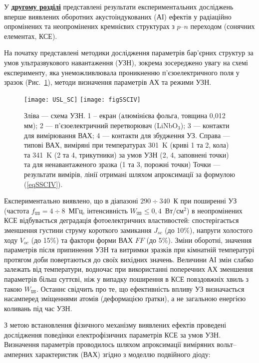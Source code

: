 У  \underline{\textbf{другому розділі}} представлені результати експериментальних досліджень вперше виявлених оборотних акустоіндукованих (АІ) ефектів у радіаційно опромінених та неопромінених кремнієвих структурах з  $p$--$n$ переходом (сонячних елементах, КСЕ).

На початку представлені методики дослідження параметрів бар'єрних структур за умов ультразвукового навантаження (УЗН),
зокрема зосереджено увагу на схемі експерименту, яка унеможливлювала проникненню п'єзоелектричного поля у зразок (Рис.~\ref{USL_SC}), методи визначення параметрів АХ та режими УЗН.


\begin{figure}[ht]
\center
\texttt{[image: USL\_SC]} \hfill
\texttt{[image: figSSCIV]}
\caption{\label{USL_SC}
Зліва --- схема УЗН.
1 --  екран (алюмінієва фольга, товщина 0,012 мм);
2 --- п'єзоелектричний перетворювач (LiNbO$_3$);
3 --- контакти для вимірювання ВАХ;
4 --- контакти для збудження УЗ.
Справа --- типові ВАХ, виміряні при температурах 301~K (криві 1 та 2, кола) та 341~K (2 та 4, трикутники)
за умов УЗН (2, 4, заповнені точки) та для ненавантаженого зразка (1 та 3, порожні точки)
Точки --- результати вимірів, лінії отримані шляхом апроксимації за формулою (\ref{eqSSCIV}).
}%
\end{figure}

Експериментально виявлено, що в діапазоні $290\div340$~К при поширенні УЗ (частота $f_\mathtt{US}=4\div8$~МГц, інтенсивність $W_\mathtt{US}\leq0,4$~Вт/см$^2$) в неопромінених КСЕ відбувається деградація
фотоелектричних властивостей:
спостерігається зменшення густини струму короткого замикання $J_{sc}$ (до 10\%), напруги холостого ходу $V_{oc}$ (до 15\%) та фактори форми ВАХ $F\!F$ (до 5\%).
Зміни оборотні, значення параметрів  після припинення УЗН  та витримки зразків при кімнатній температурі протягом доби повертаються до своїх вихідних значень.
Величини АІ змін слабко залежать від температури, водночас при використанні поперечних АХ зменшення параметрів більш суттєві, ніж у випадку поширення в КСЕ повздовжніх хвиль з такою  $W_\mathtt{US}$.
Останнє свідчить про те, що ефективність впливу УЗ визначається насамперед зміщеннями атомів (деформацією ґратки), а не загальною енергією коливань під час УЗН.


З метою встановлення фізичного механізму виявлених ефектів проведені дослідження поведінки електрофізичних параметрів КСЕ за умов УЗН.
Визначення параметрів проводилось шляхом апроксимації виміряних вольт--амперних характеристик (ВАХ) згідно з моделлю подвійного діоду:

